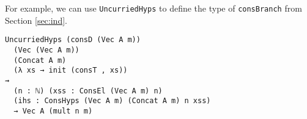 \documentclass[preprint,nonatbib]{sigplanconf}
\newcommand{\refsec}[1]{Section \ref{sec:#1}}
\newcommand{\refparte}[1]{Part$_E$ \ref{parte:#1}}
\begin{document}
For example, we can use {\tt UncurriedHyps} to define the type of
{\tt consBranch} from \refsec{ind}.

\begin{verbatim}
UncurriedHyps (consD (Vec A m))
  (Vec (Vec A m))
  (Concat A m)
  (λ xs → init (consT , xs))
⇝
  (n : ℕ) (xss : ConsEl (Vec A m) n)
  (ihs : ConsHyps (Vec A m) (Concat A m) n xss)
  → Vec A (mult n m)
\end{verbatim}









\end{document}
